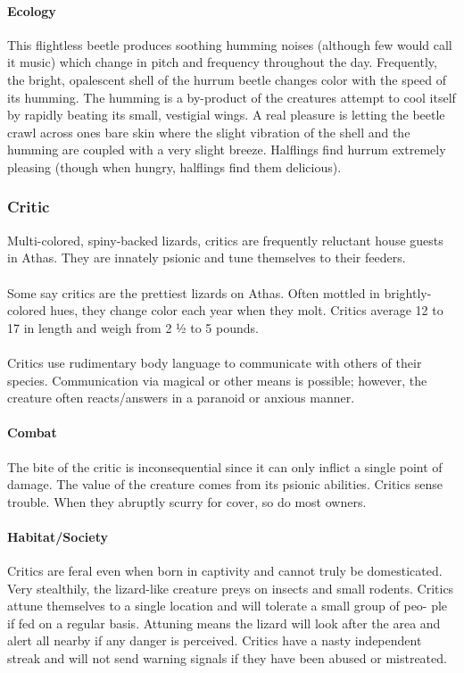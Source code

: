 \paragraph{Ecology}
This flightless beetle produces soothing humming noises
(although few would call it music) which change in pitch and
frequency throughout the day. Frequently, the bright, opalescent
shell of the hurrum beetle changes color with the speed of its
humming. The humming is a by-product of the creatures attempt to
cool itself by rapidly beating its small, vestigial wings. A real
pleasure is letting the beetle crawl across ones bare skin where the
slight vibration of the shell and the humming are coupled with a
very slight breeze. Halflings find hurrum extremely pleasing
(though when hungry, halflings find them delicious).

\subsubsection{Critic}

Multi-colored, spiny-backed lizards, critics are frequently reluctant
house guests in Athas. They are innately psionic and tune
themselves to their feeders.\\
\\
Some say critics are the prettiest lizards on Athas. Often mottled
in brightly-colored hues, they change color each year when
they molt. Critics average 12 to 17 in length and weigh from 2
1⁄2 to 5 pounds.\\
\\
Critics use rudimentary body language to communicate with
others of their species. Communication via magical or other
means is possible; however, the creature often reacts/answers in
a paranoid or anxious manner.

\paragraph{Combat}
The bite of the critic is inconsequential since it can only
inflict a single point of damage. The value of the creature comes
from its psionic abilities. Critics sense trouble. When they
abruptly scurry for cover, so do most owners.

\paragraph{Habitat/Society}
Critics are feral even when born in captivity
and cannot truly be domesticated. Very stealthily, the lizard-like
creature preys on insects and small rodents. Critics attune
themselves to a single location and will tolerate a small group of peo-
ple if fed on a regular basis. Attuning means the lizard will
look after the area and alert all nearby if any danger is
perceived. Critics have a nasty independent streak and will not
send warning signals if they have been abused or mistreated.

